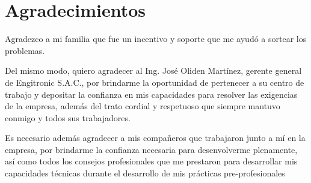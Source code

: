 \cleardoublepage
{}
{}
\chapter*{Agradecimientos}
\vspace{1.0in}

Agradezco a mi familia que fue un incentivo y soporte que me ayudó a sortear los problemas.

Del mismo modo, quiero agradecer al Ing. José Oliden Martínez, gerente general de Engitronic S.A.C., por brindarme la oportunidad de pertenecer a su centro de trabajo y depositar la confianza en mis capacidades para resolver las exigencias de la empresa, además del trato cordial y respetuoso que siempre mantuvo conmigo y todos sus trabajadores.

Es necesario además agradecer a mis compañeros que trabajaron junto a mí en la empresa, por brindarme la confianza necesaria para desenvolverme plenamente, así como todos los consejos profesionales que me prestaron para desarrollar mis capacidades técnicas durante el desarrollo de mis prácticas pre-profesionales


\newpage
